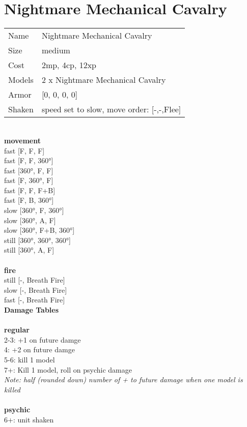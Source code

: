 \ \\
 
\ \\













\clearpage

\section{ Nightmare Mechanical Cavalry }

\begin{tabular}{ll}
  Name & Nightmare Mechanical Cavalry \\
  Size & medium\\
  Cost & 2mp, 4cp, 12xp\\
  Models & 2 x Nightmare Mechanical Cavalry\\
  Armor & [0, 0, 0, 0]\\
  Shaken & speed set to slow, move order: [-,-,Flee]\\
\end{tabular}

\noindent 

\ \\ {\bf movement } \\
fast [F, F, F] \\
fast [F, F, 360°] \\
fast [360°, F, F] \\
fast [F, 360°, F] \\
fast [F, F, F+B] \\
fast [F, B, 360°] \\
slow [360°, F, 360°] \\
slow [360°, A, F] \\
slow [360°, F+B, 360°] \\
still [360°, 360°, 360°] \\
still [360°, A, F] \\
\ \\ {\bf fire } \\
still [-, Breath Fire] \\
slow [-, Breath Fire] \\
fast [-, Breath Fire] \\


{\bf Damage Tables} \\
\ \\ {\bf regular } \\
2-3: +1 on future damge \\
4: +2 on future damge \\
5-6: kill 1 model \\
7+: Kill 1 model, roll on psychic damage \\
{{\it Note: half (rounded down) number of + to future damage when one model is killed}} \\
\ \\ {\bf psychic } \\
6+: unit shaken \\


